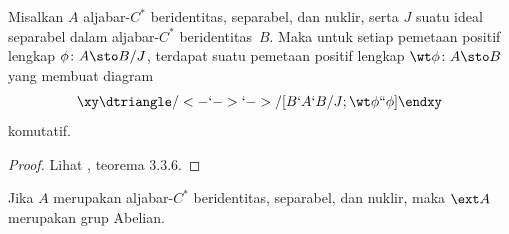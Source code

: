 \begin{prop}\label{0058541} Misalkan $A$ aljabar-$C^*$ beridentitas, separabel, dan nuklir, serta $J$ suatu
ideal separabel dalam aljabar-$C^*$ beridentitas~$B$. Maka untuk setiap pemetaan positif lengkap
$\phi\colon A \sto B/J$, terdapat suatu pemetaan positif lengkap $\wt\phi\colon A \sto B$
yang membuat diagram
  \[
    \xy
      \dtriangle/<-`->`->/[B`A`B/J;\wt\phi``\phi]
    \endxy
   \]
komutatif.
\end{prop}

\begin{proof} Lihat \cite{HigsonR:2000}, teorema 3.3.6.  \ns \end{proof}

\begin{cor}\label{0058543} Jika $A$ merupakan aljabar-$C^*$ beridentitas, separabel, dan nuklir,
maka $\ext A$ merupakan grup Abelian.
\end{cor}







\endinput
